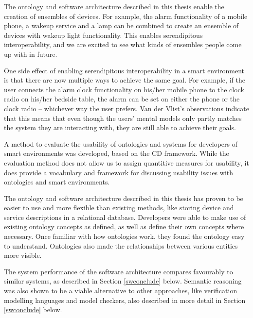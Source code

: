 The ontology and software architecture described in this thesis enable the creation of ensembles of devices. For example, the alarm functionality of a mobile phone, a wakeup service and a lamp can be combined to create an ensemble of devices with wakeup light functionality. This enables serendipitous interoperability, and we are excited to see what kinds of ensembles people come up with in future.

One side effect of enabling serendipitous interoperability in a smart environment is that there are now multiple ways to achieve the same goal. For example, if the user connects the alarm clock functionality on his/her mobile phone to the clock radio on his/her bedside table, the alarm can be set on either the phone or the clock radio -- whichever way the user prefers. Van der Vlist's \cite{Bram} observations indicate that this means that even though the users' mental models only partly matches the system they are interacting with, they are still able to achieve their goals.

A method to evaluate the usability of ontologies and systems for developers of smart environments was developed, based on the \ac{CD} framework. While the evaluation method does not allow us to assign quantitive measures for usability, it does provide a vocabulary and framework for discussing usability issues with ontologies and smart environments.%

The ontology and software architecture described in this thesis has proven to be easier to use and more flexible than existing methods, like  storing device and service descriptions in a relational database. Developers were able to make use of existing ontology concepts as defined, as well as define their own concepts where necessary. Once familiar with how ontologies work, they found the ontology easy to understand. Ontologies also made the relationships between various entities more visible.

The system performance of the software architecture compares favourably to similar systems, as described in Section \ref{swconclude} below. Semantic reasoning was also shown to be a viable alternative to other approaches, like verification modelling languages and model checkers, also described in more detail in Section \ref{swconclude} below.


